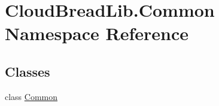 \hypertarget{a00432}{}\section{Cloud\+Bread\+Lib.\+Common Namespace Reference}
\label{a00432}
\subsection*{Classes}
\begin{DoxyCompactItemize}
\item 
class \hyperlink{a00066}{Common}
\end{DoxyCompactItemize}
